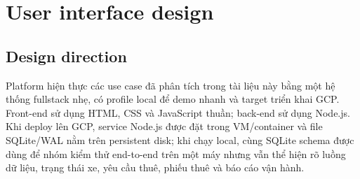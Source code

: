 \section{User interface design}

\subsection{Design direction}
Platform hiện thực các use case đã phân tích trong tài liệu này bằng một hệ
thống fullstack nhẹ, có profile local để demo nhanh và target triển khai GCP.
Front-end sử dụng HTML, CSS và JavaScript thuần; back-end sử dụng Node.js. Khi
deploy lên GCP, service Node.js được đặt trong VM/container và file SQLite/WAL nằm
trên persistent disk; khi chạy local, cùng SQLite schema được dùng để nhóm kiểm
thử end-to-end trên một máy nhưng vẫn thể hiện rõ luồng dữ liệu, trạng thái xe,
yêu cầu thuê, phiếu thuê và báo cáo vận hành.


